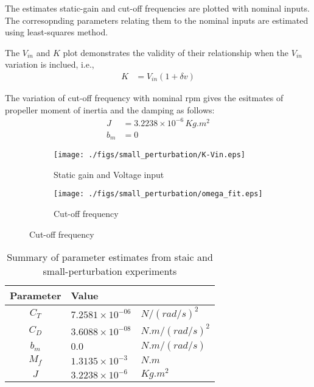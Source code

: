 The estimates static-gain and cut-off frequencies are plotted with nominal inputs. The corresopnding parameters relating them to the nominal inputs are estimated using least-squares method.

The $V_{in}$ and $K$ plot demonstrates the validity of their relationship when the $V_{in}$ variation is inclued, i.e.,
\begin{align*}
    K &= V_{in} (1 + \delta v)
\end{align*}

The variation of cut-off frequency with nominal rpm gives the esitmates of propeller moment of inertia and the damping as follows:
\begin{align*}
    J &= 3.2238 \times 10^{-6} \, Kg .m^2\\
    b_m &= 0
\end{align*}

\begin{figure}[H]
    \centering
    \begin{minipage}{0.49\textwidth}
        \begin{figure}[H]
            \texttt{[image: ./figs/small\_perturbation/K-Vin.eps]}
            \caption{Static gain and Voltage input}
        \end{figure}
    \end{minipage}
    \begin{minipage}{0.49\textwidth}
        \begin{figure}[H]
            \texttt{[image: ./figs/small\_perturbation/omega\_fit.eps]}
            \caption{Cut-off frequency}
        \end{figure}
    \end{minipage}
\end{figure}


\begin{table}[H]
    \centering
    \begin{tabular}{c l l}
        \hline \hline
        Parameter & Value & \\ \hline \hline
        $C_T$ & $7.2581 \times 10^{-06}$ & $N/(rad/s)^2$  \\
        $C_D$ & $3.6088 \times 10^{-08}$ & $N.m/(rad/s)^2$ \\
        $b_m$ & $0.0$                    & $N.m/(rad/s)$\\
        $M_f$ & $1.3135 \times 10^{-3}$  & $N.m$\\
        $J$   & $3.2238 \times 10^{-6}$  & $Kg .m^2$ \\\hline \hline
    \end{tabular}
    \caption{Summary of parameter estimates from staic and small-perturbation experiments}
\end{table}
